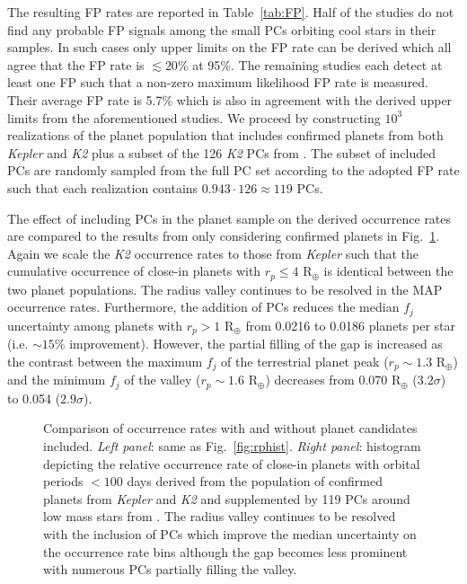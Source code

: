 \documentclass[twocolumn]{emulateapj}
\newcommand{\kepler}[1]{\emph{Kepler}#1}
\newcommand{\ktwo}[1]{\emph{K2}#1}
\begin{document}
The resulting FP rates are reported in Table~\ref{tab:FP}. Half of the studies do not find any probable
FP signals among the small PCs orbiting cool stars in their samples. In such cases only upper limits on the FP rate
can be derived which all agree that the FP rate is $\lesssim 20$\% at 95\%. The remaining studies
each detect at least one FP such that a non-zero maximum likelihood FP rate is measured. Their average FP rate is 5.7\%
which is also in agreement with the derived upper limits from the aforementioned studies.
We proceed by constructing $10^3$ realizations of the planet population
that includes confirmed planets from both \kepler{} and \ktwo{} plus a subset of the 126 \ktwo{} PCs from
\cite{kruse19}. The subset of included PCs are randomly sampled from the full PC set
according to the adopted FP rate such that each realization contains $0.943\cdot 126 \approx 119$ PCs.




The effect of including PCs in the planet sample on the derived occurrence rates are compared to the results
from only considering confirmed planets in Fig.~\ref{fig:rphistPCs}. Again we scale the \ktwo{} occurrence rates
to those from \kepler{} such that the cumulative occurrence of close-in planets with $r_p \leq 4$ R$_{\oplus}$
is identical between the two planet populations. The radius valley continues to be resolved in
the MAP occurrence rates. Furthermore, the addition of PCs reduces the median $f_j$ uncertainty among planets
with $r_p>1$ R$_{\oplus}$ from
0.0216 to 0.0186 planets per star (i.e. $\sim 15$\% improvement). However, the partial filling of the gap is
increased as the contrast between the maximum $f_j$ of the terrestrial planet peak ($r_p \sim 1.3$ R$_{\oplus}$)
and the minimum $f_j$ of the valley ($r_p \sim 1.6$ R$_{\oplus}$) decreases from 0.070 R$_{\oplus}$ ($3.2\sigma$)
to 0.054 ($2.9\sigma$).

\begin{figure}
  \centering
  \caption{Comparison of occurrence rates with and without planet candidates included. \emph{Left panel}:
    same as Fig.~\ref{fig:rphist}. \emph{Right panel}: histogram depicting the relative occurrence
    rate of close-in planets with orbital periods $<100$ days derived from the population of confirmed
    planets from \kepler{} and \ktwo{} and supplemented by 119 PCs
    around low mass stars from \cite{kruse19}. The radius valley continues to be resolved with
    the inclusion of PCs which improve the median uncertainty on the occurrence rate bins although the
    gap becomes less prominent with numerous PCs partially filling the valley.}
  \label{fig:rphistPCs}
\end{figure}
\end{document}
